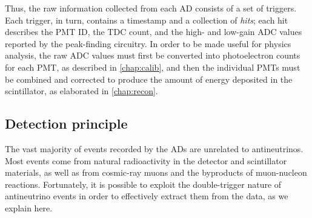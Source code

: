 \documentclass[../thesis.tex]{subfiles}
\begin{document}
Thus, the raw information collected from each AD consists of a set of triggers. Each trigger, in turn, contains a timestamp and a collection of \emph{hits}; each hit describes the PMT ID, the TDC count, and the high- and low-gain ADC values reported by the peak-finding circuitry. In order to be made useful for physics analysis, the raw ADC values must first be converted into photoelectron counts for each PMT, as described in \autoref{chap:calib}, and then the individual PMTs must be combined and corrected to produce the amount of energy deposited in the scintillator, as elaborated in \autoref{chap:recon}.

\subsection{Detection principle}
\label{sec:expDetPrinc}

The vast majority of events recorded by the ADs are unrelated to antineutrinos. Most events come from natural radioactivity in the detector and scintillator materials, as well as from cosmic-ray muons and the byproducts of muon-nucleon reactions. Fortunately, it is possible to exploit the double-trigger nature of antineutrino events in order to effectively extract them from the data, as we explain here.
\end{document}

